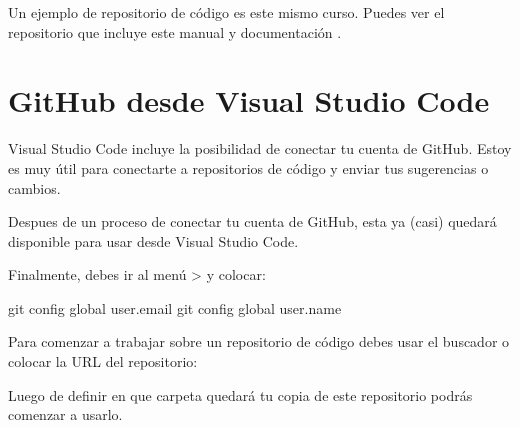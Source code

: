 \documentclass[a4paper,12pt,spanish]{sphinxmanual}
\begin{document}
\sphinxAtStartPar
Un ejemplo de repositorio de código es este mismo curso.
Puedes ver el repositorio que incluye este manual y documentación
.

\noindent{}


\section{GitHub desde Visual Studio Code}
\label{\detokenize{github:github-desde-visual-studio-code}}
\sphinxAtStartPar
Visual Studio Code incluye la posibilidad de conectar tu cuenta de GitHub.
Estoy es muy útil para conectarte a repositorios de código y enviar tus
sugerencias o cambios.

\noindent{}

\sphinxAtStartPar
Despues de un proceso de conectar tu cuenta de GitHub, esta ya
(casi) quedará disponible para usar desde Visual Studio Code.

\noindent{}

\sphinxAtStartPar
Finalmente, debes ir al menú  \sphinxhyphen{}\textgreater{}  y colocar:

\begin{sphinxVerbatim}[commandchars=\\\{\}]
git config \PYGZhy{}\PYGZhy{}global user.email 
git config \PYGZhy{}\PYGZhy{}global user.name 
\end{sphinxVerbatim}

\noindent{}

\sphinxAtStartPar
Para comenzar a trabajar sobre un repositorio de código debes usar el
buscador o colocar la URL del repositorio:

\noindent{}

\sphinxAtStartPar
Luego de definir en que carpeta quedará tu copia de este repositorio
podrás comenzar a usarlo.

\noindent{}
\end{document}
